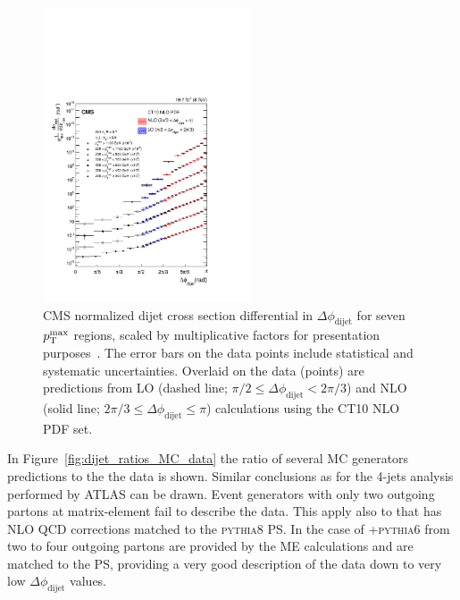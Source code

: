 \documentclass{PoS}
\def\as{\ensuremath{\alpha_\mathrm{S}}\xspace}
\providecommand{\dphi}{\ensuremath{\Delta\phi_\text{dijet}}\xspace}
\providecommand{\ptmax}{\ensuremath{\pt^{\text{max}}}\xspace}
\providecommand{\PYTHIAS} {{\textsc{pythia6}}\xspace}
\providecommand{\PYTHIAE} {{\textsc{pythia8}}\xspace}
\begin{document}
\begin{figure}[hbtp]
  \centering
  \includegraphics[width=0.55\textwidth]{Figure7a.pdf}
  \caption{CMS normalized dijet cross section differential in \dphi for
    seven \ptmax regions, scaled by multiplicative factors for
    presentation purposes~\cite{Khachatryan:2016hkr}.  The error bars on the data points include
    statistical and systematic uncertainties. Overlaid on the data
    (points) are predictions from LO (dashed line; $\pi/2 \leq
    \dphi < 2\pi/3$) and NLO (solid line; $2\pi/3 \leq \dphi \leq
    \pi$) calculations using the CT10 NLO PDF set. 
}
  \label{fig:dijet}
\end{figure}
In Figure~\ref{fig:dijet_ratios_MC_data} the ratio of several MC generators predictions to
the the data is shown. Similar conclusions as for the 4-jets analysis performed by ATLAS can be drawn. Event generators with only two outgoing
partons at matrix-element fail to describe the data. This apply also to \POWHEG that has NLO 
QCD corrections matched to the \PYTHIAE PS. In the case of \MADGRAPH+\PYTHIAS from two to four outgoing partons are
provided by the ME calculations and are matched to the PS, providing a very good description of the data down to very
low \dphi values.  
\end{document}
